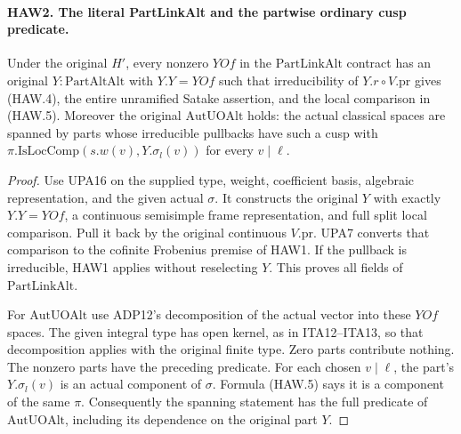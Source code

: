\documentclass[11pt,a4paper]{article}
\numberwithin{equation}{section}
\theoremstyle{remark}\newtheorem{remark}[theorem]{Remark}
\begin{document}
\paragraph{HAW2. The literal PartLinkAlt and the partwise ordinary cusp predicate.}
\label{claim:HAW2}
Under the original $H'$, every nonzero $YOf$ in the
$\mathrm{PartLinkAlt}$ contract has an original
$Y:\mathrm{PartAltAlt}$ with $Y.Y=YOf$ such that irreducibility
of $Y.r\circ V.\mathrm{pr}$ gives (HAW.4), the entire
unramified Satake assertion, and the local comparison in
(HAW.5).  Moreover the original $\mathrm{AutUOAlt}$ holds:
the actual classical spaces are spanned by parts whose
irreducible pullbacks have such a cusp with
$\pi.\mathrm{IsLocComp}(s.w(v),Y.\sigma_l(v))$ for every
$v\mid\ell$.
\begin{proof}
Use UPA16 on the supplied type, weight, coefficient basis,
algebraic representation, and the given actual $\sigma$.
It constructs the original $Y$ with exactly $Y.Y=YOf$, a
continuous semisimple frame representation, and full split
local comparison.  Pull it back by the original continuous
$V.\mathrm{pr}$.  UPA7 converts that comparison to the
cofinite Frobenius premise of HAW1.  If the pullback is
irreducible, HAW1 applies without reselecting $Y$.
This proves all fields of $\mathrm{PartLinkAlt}$.

For $\mathrm{AutUOAlt}$ use ADP12's decomposition of the
actual vector into these $YOf$ spaces.  The given integral
type has open kernel, as in ITA12--ITA13, so that decomposition
applies with the original finite type.  Zero parts contribute
nothing.  The nonzero parts have the preceding predicate.
For each chosen $v\mid\ell$, the part's $Y.\sigma_l(v)$
is an actual component of $\sigma$.  Formula (HAW.5) says it
is a component of the same $\pi$.  Consequently the spanning
statement has the full predicate of $\mathrm{AutUOAlt}$,
including its dependence on the original part $Y$.
\end{proof}

\end{document}
